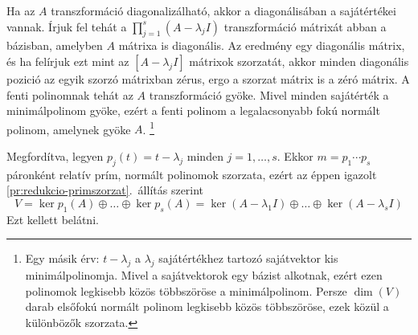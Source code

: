 \documentclass[a4paper, showtrims]{memoir}
\makeatletter
\renewenvironment{proof}[1][\proofname]
    {\par\pushQED{\qed}%
    \normalfont \topsep6\p@\@plus6\p@\relax
    \trivlist
    \item[\hskip\labelsep
        \itshape
    #1\@addpunct{:}]\ignorespaces}
    {\popQED\endtrivlist\@endpefalse}
\theoremstyle{plain}
\theoremstyle{remark}
\theoremstyle{definition}
\makeatother
\begin{document}
\begin{proof}
	Ha az $A$ transzformáció diagonalizálható,
	akkor a diagonálisában a sajátértékei vannak.
	Írjuk fel tehát a
	\begin{math}
		\prod_{j=1}^s\left( A-\lambda_j I \right)
	\end{math}
	transzformáció mátrixát abban a bázisban,
	amelyben $A$ mátrixa is diagonális.
	Az eredmény egy diagonális mátrix,
	és ha felírjuk ezt mint az $[A-\lambda_j I]$ mátrixok szorzatát,
	akkor minden diagonális pozició az egyik szorzó mátrixban zérus,
	ergo a szorzat mátrix is a zéró mátrix.
	A fenti polinomnak tehát az $A$ transzformáció gyöke.
	Mivel minden sajátérték a minimálpolinom gyöke,
	ezért a fenti polinom a legalacsonyabb fokú normált polinom,
	amelynek gyöke $A$.
	\footnote{
		Egy másik érv: $t-\lambda_j$ a $\lambda_j$ sajátértékhez tartozó sajátvektor kis minimálpolinomja.
		Mivel a sajátvektorok egy bázist alkotnak,
		ezért ezen polinomok legkisebb közös többszöröse a minimálpolinom.
		Persze $\dim(V)$ darab elsőfokú normált polinom legkisebb közös többszöröse,
		ezek közül a különbözők szorzata.
	}

	Megfordítva,
	legyen $p_j\left( t \right)=t-\lambda_j$ minden $j=1,\ldots,s.$
	Ekkor $m=p_1\cdots p_s$ páronként relatív prím, normált polinomok szorzata,
	ezért az éppen igazolt \ref{pr:redukcio-primszorzat}.~állítás szerint
	\begin{equation*}
		V=
		\ker p_1\left( A \right)\oplus\dots\oplus\ker p_s\left( A \right)
		=
		\ker\left( A-\lambda_1 I \right)\oplus\dots\oplus\ker\left( A-\lambda_s I \right)
	\end{equation*}
	Ezt kellett belátni.
\end{proof}
\end{document}

